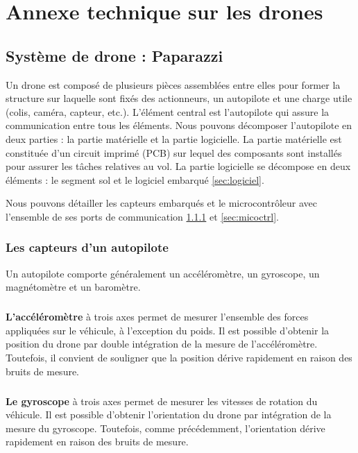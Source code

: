 \chapter{Annexe technique sur les drones}
\label{chap:annexe1}

\section{Système de drone : Paparazzi}

Un drone est composé de plusieurs pièces assemblées entre elles pour former la structure sur laquelle sont fixés des actionneurs, un autopilote et une charge utile (colis, caméra, capteur, etc.). L'élément central est l'autopilote qui assure la communication entre tous les éléments. Nous pouvons décomposer l'autopilote en deux parties : la partie matérielle et la partie logicielle.
La partie matérielle est constituée d'un circuit imprimé (PCB) sur lequel des composants sont installés pour assurer les tâches relatives au vol. La partie logicielle se décompose en deux éléments : le segment sol et le logiciel embarqué \ref{sec:logiciel}.

Nous pouvons détailler les capteurs embarqués et le microcontrôleur avec l'ensemble de ses ports de communication \ref{sec:capteurs} et \ref{sec:micoctrl}. 

 \subsection{Les capteurs d'un autopilote}
 \label{sec:capteurs}
 Un autopilote comporte généralement un accéléromètre, un gyroscope, un magnétomètre et un baromètre.
 
 \paragraph*{}
 \textbf{L'accéléromètre} à trois axes permet de mesurer l'ensemble des forces appliquées sur le véhicule, à l'exception du poids. Il est possible d'obtenir la position du drone par double intégration de la mesure de l'accéléromètre. Toutefois, il convient de souligner que la position dérive rapidement en raison des bruits de mesure.

 \paragraph*{}
 \textbf{Le gyroscope} à trois axes permet de mesurer les vitesses de rotation du véhicule. Il est possible d'obtenir l'orientation du drone par intégration de la mesure du gyroscope. Toutefois, comme précédemment, l'orientation dérive rapidement en raison des bruits de mesure.

